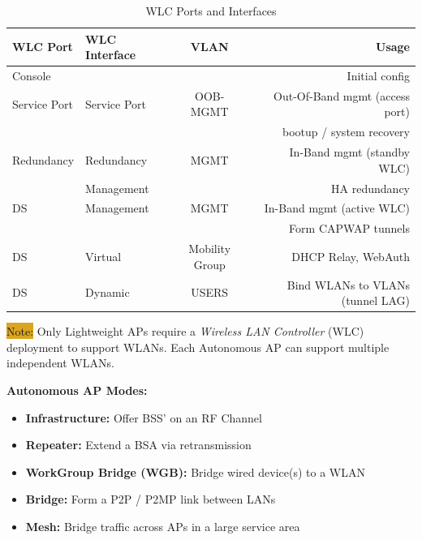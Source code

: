 \documentclass[12pt]{article}
\newcommand{\note}[1]{\colorbox{#1}{Note:}}
\begin{document}
	\begin{table}[H]
	\centering
	\caption{WLC Ports and Interfaces \label{tab:WLC PORTS}}
	\begin{tabular}{llcr}
	\hline
	\textbf{WLC Port}	& \textbf{WLC Interface}	& \textbf{VLAN}		& \textbf{Usage}\\\hline
	Console		&					&				& Initial config\\\hline
	Service Port		& Service Port			& OOB-MGMT		& Out-Of-Band mgmt (access port)\\
				&					&				& bootup / system recovery\\\hline
	Redundancy	& Redundancy			& MGMT			& In-Band mgmt (standby WLC)\\
				& Management			&				& HA redundancy\\\hline
	DS			& Management			& MGMT			& In-Band mgmt (active WLC)\\
				&					&				& Form CAPWAP tunnels\\\hline
	DS			& Virtual				& Mobility Group		& DHCP Relay, WebAuth\\\hline
	DS			& Dynamic				& USERS			& Bind WLANs to VLANs (tunnel LAG)\\\hline
	\end{tabular}\end{table}
	\note{Goldenrod} Only Lightweight APs require a \textit{Wireless LAN Controller} (WLC) deployment to support WLANs. Each Autonomous AP can support multiple independent WLANs.

	\textbf{Autonomous AP Modes:}
	\begin{itemize} \itemsep -5pt
		\label{itm:AUTONOMOUS AP}
		\item{\textbf{Infrastructure:} Offer BSS' on an RF Channel}
		\item{\textbf{Repeater:} Extend a BSA via retransmission}
		\item{\textbf{WorkGroup Bridge (WGB):} Bridge wired device(s) to a WLAN}
		\item{\textbf{Bridge:} Form a P2P / P2MP link between LANs}
		\item{\textbf{Mesh:} Bridge traffic across APs in a large service area}
	\end{itemize}
\end{document}
